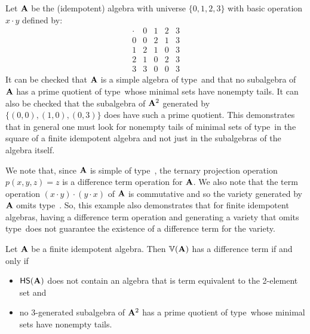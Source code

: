 \begin{example}\label{alg:nodiff}
Let $\mathbf{A}$ be the (idempotent) algebra with universe $\{0,1,2, 3\}$ with basic operation $x\cdot y$ defined by:
  \[
  \begin{array}{c|cccc}
  \cdot&0&1&2&3\\\hline
  0&0&2&1&3\\
  1&2&1&0&3\\
  2&1&0&2&3\\
  3&3&0&0&3
  \end{array}
  \]
It can be checked that $\mathbf{A}$ is a simple algebra of type~\btyp and that no subalgebra of $\mathbf{A}$ has a prime quotient of type~\atyp whose minimal sets have nonempty tails.  It can also be checked that the subalgebra of $\mathbf{A}^2$ generated by $\{(0,0), (1,0), (0,3)\}$ does have such a prime quotient.
This demonstrates that in general one must look for nonempty tails of minimal sets of type~\atyp in the square of a finite idempotent algebra and not just in the subalgebras of the algebra itself.

We note that, since $\mathbf{A}$ is simple of type~\btyp, the ternary projection operation $p(x,y,z ) = z$ is a difference term operation for $\mathbf{A}$.  We also note that the term operation $(x\cdot y) \cdot(y \cdot x)$ of $\mathbf{A}$ is commutative and so the variety generated by $\mathbf{A}$ omits type~\utyp.  So, this example also demonstrates that for finite idempotent algebras, having a difference term operation and generating a variety that omits type~\utyp does not guarantee the existence of a difference term for the variety.
\end{example}

\begin{corollary}\label{cor:diffterm}
  Let $\mathbf{A}$ be a finite idempotent algebra.  Then $\operatorname{\mathbb{V}}(\mathbf{A})$ has a difference term if and only if
  \begin{itemize}
  \item $\mathsf{H} \mathsf{S} (\mathbf{A})$ does not contain an algebra that is term equivalent to the 2-element set and
      \item no 3-generated subalgebra of $\mathbf{A}^2$ has a prime quotient of type~\atyp whose minimal sets have nonempty tails.
  \end{itemize}
\end{corollary}

